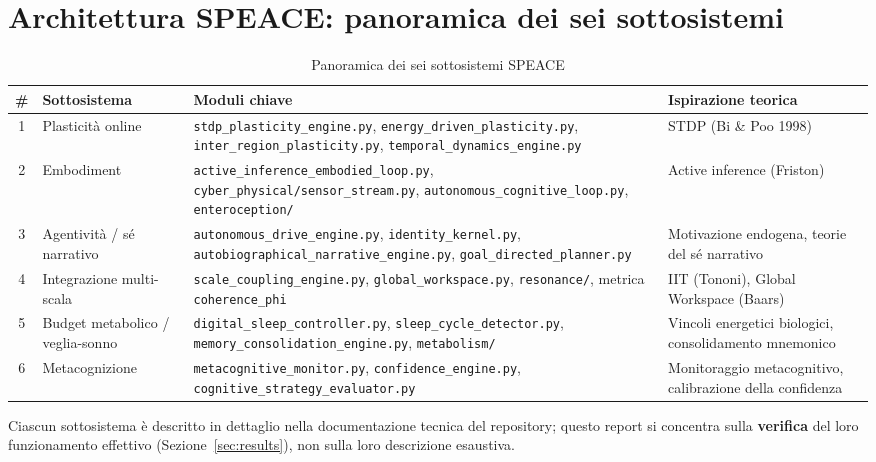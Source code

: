 \documentclass[11pt,a4paper]{article}
\newcommand{\code}[1]{\texttt{#1}}
\newcommand{\coherencephi}{\code{coherence\_phi}}
\begin{document}
\section{Architettura SPEACE: panoramica dei sei sottosistemi}
\label{sec:arch}

\begin{table}[h]
\centering
\caption{Panoramica dei sei sottosistemi SPEACE}
\label{tab:sottosistemi}
\begin{tabular}{cp{3cm}p{5cm}p{3cm}}
\toprule
\textbf{\#} & \textbf{Sottosistema} & \textbf{Moduli chiave} & \textbf{Ispirazione teorica} \\
\midrule
1 & Plasticit\`a online & \code{stdp\_plasticity\_engine.py}, \code{energy\_driven\_plasticity.py}, \code{inter\_region\_plasticity.py}, \code{temporal\_dynamics\_engine.py} & STDP (Bi \& Poo 1998) \\
2 & Embodiment & \code{active\_inference\_embodied\_loop.py}, \code{cyber\_physical/sensor\_stream.py}, \code{autonomous\_cognitive\_loop.py}, \code{enteroception/} & Active inference (Friston) \\
3 & Agentivit\`a / s\'e narrativo & \code{autonomous\_drive\_engine.py}, \code{identity\_kernel.py}, \code{autobiographical\_narrative\_engine.py}, \code{goal\_directed\_planner.py} & Motivazione endogena, teorie del s\'e narrativo \\
4 & Integrazione multi-scala & \code{scale\_coupling\_engine.py}, \code{global\_workspace.py}, \code{resonance/}, metrica \coherencephi{} & IIT (Tononi), Global Workspace (Baars) \\
5 & Budget metabolico / veglia-sonno & \code{digital\_sleep\_controller.py}, \code{sleep\_cycle\_detector.py}, \code{memory\_consolidation\_engine.py}, \code{metabolism/} & Vincoli energetici biologici, consolidamento mnemonico \\
6 & Metacognizione & \code{metacognitive\_monitor.py}, \code{confidence\_engine.py}, \code{cognitive\_strategy\_evaluator.py} & Monitoraggio metacognitivo, calibrazione della confidenza \\
\bottomrule
\end{tabular}
\end{table}

Ciascun sottosistema \`e descritto in dettaglio nella documentazione tecnica del repository; questo report si concentra sulla \textbf{verifica} del loro funzionamento effettivo (Sezione~\ref{sec:results}), non sulla loro descrizione esaustiva.
\end{document}
